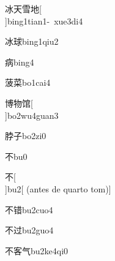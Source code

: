 \begin{verbete}[6;4;11;6]{冰天雪地}[\\]{bing1tian1-\ xue3di4}
\end{verbete}

\begin{verbete}[6;11]{冰球}{bing1qiu2}
\end{verbete}

\begin{verbete}[10]{病}{bing4}
\end{verbete}

\begin{verbete}[11;12]{菠菜}{bo1cai4}
\end{verbete}

\begin{verbete}[12;8;11]{博物馆}[\\]{bo2wu4guan3}
\end{verbete}

\begin{verbete}[11;3]{脖子}{bo2zi0}
\end{verbete}

\begin{verbete}[4]{不}{bu0}
\end{verbete}

\begin{verbete}[4]{不}[\\]{bu2}[ (antes de quarto tom)]
\end{verbete}

\begin{verbete}[4;13]{不错}{bu2cuo4}
\end{verbete}

\begin{verbete}[4;6]{不过}{bu2guo4}
\end{verbete}

\begin{verbete}[4;9;4]{不客气}{bu2ke4qi0}
\end{verbete}

